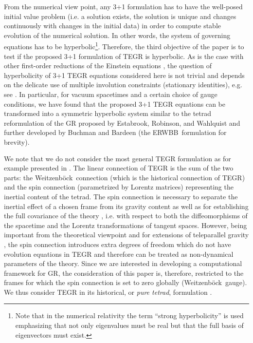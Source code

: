 \documentclass[
10pt, %
a4paper, %
oneside, %
twocolumn,
headinclude,footinclude, %
BCOR5mm, %
]{scrartcl}
\newcommand{\ERWBB}{{ERWBB}}
\newcommand{\We}{Weitzenb\"ock}
\begin{document}
	From the numerical view point, any 3+1 formulation has to have the
	well-posed initial value problem (i.e. a solution exists, the solution is
	unique and changes continuously with changes in the initial data) in order
	to compute stable evolution of the numerical solution. In other words, the
	system of governing equations has to be hyperbolic\footnote{Note that in the
	numerical relativity the term ``strong hyperbolicity'' is used emphasizing
	that not only eigenvalues must be real but that the full basis of
	eigenvectors must exist.}. Therefore, the third objective of the paper is to
	test if the proposed 3+1 formulation of TEGR is hyperbolic. As is the case
	with other first-order reductions of the Einstein equations
	\cite{Baumgarte2003a}, the question of hyperbolicity of 3+1 TEGR equations
	considered here is not trivial and depends on the delicate use of multiple
	involution constraints (stationary identities), e.g. see \cite{FO-CCZ4}. In
	particular, for vacuum spacetimes and a certain choice of gauge conditions,
	we have found that the proposed 3+1 TEGR equations can be transformed into a
	symmetric hyperbolic system similar to the tetrad reformulation of the GR
	proposed by Estabrook, Robinson, and Wahlquist \cite{Estabrook1997} and
	further developed by Buchman and Bardeen
	\cite{Buchman2003,Buchman2005,Bardeen2011} (the \ERWBB\ formulation for
	brevity). 
	
	We note that we do not consider the most general TEGR formulation as for
	example presented in \cite{AldrovandiPereiraBook}. The linear connection of
	TEGR is the sum of the two parts: the \We\ connection (which is the
	historical connection of TEGR) and the spin connection (parametrized by
	Lorentz matrices) representing the inertial content of the tetrad. The spin
	connection is necessary to separate the inertial effect of a chosen frame
	from its gravity content as well as for establishing the full covariance of
	the theory \cite{AldrovandiPereiraBook,Golovnev2017a,Krssak2019}, i.e. with
	respect to both the diffeomorphisms of the spacetime and the Lorentz
	transformations of tangent spaces. However, being important from the
	theoretical viewpoint and for extensions of teleparallel gravity
	\cite{Golovnev2017a}, the spin connection introduces extra degrees of
	freedom which do not have evolution equations in TEGR and therefore can be
	treated as non-dynamical parameters of the theory. Since we are
	interested in developing a computational framework for GR, the consideration
	of this paper is, therefore, restricted to the frames for which the spin
	connection is set to zero globally (\We\ gauge). We thus consider TEGR in
	its historical, or \emph{pure tetrad}, formulation \cite{Golovnev2017a}.
	
\end{document}
